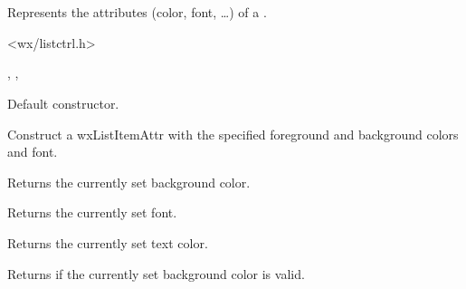\section{}\label{wxListItemAttr}

Represents the attributes (color, font, \ldots) of a
 .


<wx/listctrl.h>


, , 


\label{wxlistitemattrctor}


Default constructor.


Construct a wxListItemAttr with the specified foreground and
background colors and font.

\label{wxlistitemattrgetbackgroundcolour}


Returns the currently set background color.


\label{wxlistitemattrgetfont}


Returns the currently set font.


\label{wxlistitemattrgettextcolour}

Returns the currently set text color.


\label{wxlistitemattrhasbackgroundcolour}


Returns \true if the currently set background color is valid.


\label{wxlistitemattrhasfont}

